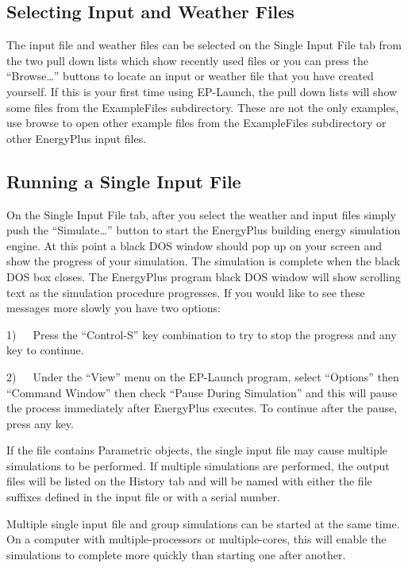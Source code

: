 \subsection{Selecting Input and Weather Files}\label{selecting-input-and-weather-files}

The input file and weather files can be selected on the Single Input File tab from the two pull down lists which show recently used files or you can press the ``Browse\ldots{}'' buttons to locate an input or weather file that you have created yourself. If this is your first time using EP-Launch, the pull down lists will show some files from the ExampleFiles subdirectory. These are not the only examples, use browse to open other example files from the ExampleFiles subdirectory or other EnergyPlus input files.

\subsection{Running a Single Input File}\label{running-a-single-input-file}

On the Single Input File tab, after you select the weather and input files simply push the ``Simulate\ldots{}'' button to start the EnergyPlus building energy simulation engine. At this point a black DOS window should pop up on your screen and show the progress of your simulation. The simulation is complete when the black DOS box closes. The EnergyPlus program black DOS window will show scrolling text as the simulation procedure progresses. If you would like to see these messages more slowly you have two options:

1)~~~Press the ``Control-S'' key combination to try to stop the progress and any key to continue.

2)~~~Under the ``View'' menu on the EP-Launch program, select ``Options'' then ``Command Window'' then check ``Pause During Simulation'' and this will pause the process immediately after EnergyPlus executes. To continue after the pause, press any key.

If the file contains Parametric objects, the single input file may cause multiple simulations to be performed. If multiple simulations are performed, the output files will be listed on the History tab and will be named with either the file suffixes defined in the input file or with a serial number.

Multiple single input file and group simulations can be started at the same time. On a computer with multiple-processors or multiple-cores, this will enable the simulations to complete more quickly than starting one after another.

